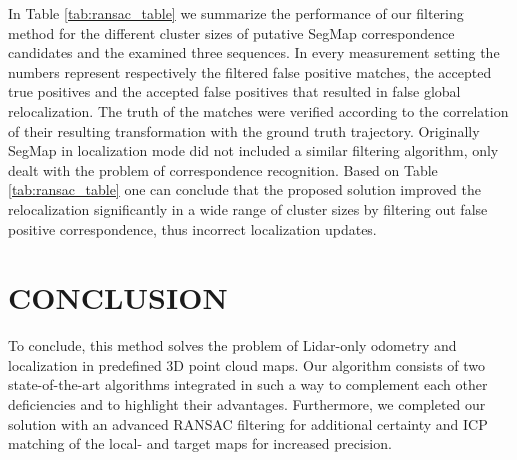 \documentclass[letterpaper, 10 pt, conference]{ieeeconf}  %
\begin{document}
In Table \ref{tab:ransac_table} we summarize the performance of our filtering method for the different cluster sizes of putative SegMap correspondence candidates and the examined three sequences. 
In every measurement setting the numbers represent respectively the filtered false positive matches, the accepted true positives and the accepted false positives that resulted in false global relocalization.
The truth of the matches were verified according to the correlation of their resulting transformation with the ground truth trajectory. Originally SegMap in localization mode did not included a similar filtering algorithm, only dealt with the problem of correspondence recognition. Based on Table \ref{tab:ransac_table} one can conclude that the proposed solution improved the relocalization significantly in a wide range of cluster sizes by filtering out false positive correspondence, thus incorrect localization updates.

\section{CONCLUSION} \label{conclusion}
To conclude, this method solves the problem of Lidar-only odometry and localization in predefined 3D point cloud maps. Our algorithm consists of two state-of-the-art algorithms integrated in such a way to complement each other deficiencies and to highlight their advantages. Furthermore, we completed our solution with an advanced RANSAC filtering for additional certainty and ICP matching of the local- and target maps for increased precision.

\addtolength{\textheight}{-8cm}   %










\end{document}
